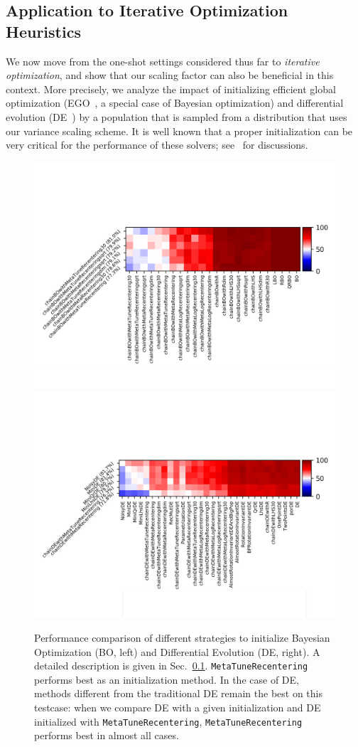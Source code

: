 \subsection{Application to Iterative Optimization Heuristics}\label{sec:initialization}
We now move from the one-shot settings considered thus far to \textit{iterative optimization}, and show that our scaling factor can also be beneficial in this context. More precisely, we analyze the impact of initializing efficient global optimization (EGO~\cite{ego}, a special case of Bayesian optimization) and differential evolution (DE~\cite{de}) by a population that is sampled from a distribution that uses our variance scaling scheme. 
It is well known that a proper initialization can be very critical for the performance of these solvers;  see~\cite{feurer2015initializing,inoculation2,centerbased,qrinit,BossekDK20} for discussions. %
\begin{figure}[t]
    \centering
    \includegraphics[trim={10 30 12 80}, clip,width=.49\textwidth]{sections/appendix/ppsn2020-rescaling/figures/parahdbo4d.png}
    \includegraphics[trim={10 30 12 80}, clip,width=.49\textwidth]{sections/appendix/ppsn2020-rescaling/figures/paraalldes.png}
    \vspace{-10pt}
    \caption{Performance comparison of different strategies to initialize Bayesian Optimization (BO, left) and Differential Evolution (DE, right). A detailed description is given in Sec.~\ref{sec:initialization}. {\texttt{MetaTuneRecentering} performs best as an initialization method. In the case of DE, methods different from the traditional DE remain the best on this testcase: when we compare DE with a given initialization and DE initialized with \texttt{MetaTuneRecentering}, \texttt{MetaTuneRecentering} performs best in almost all cases. }}
    \label{deinitxp}\label{boinit}
\end{figure}
